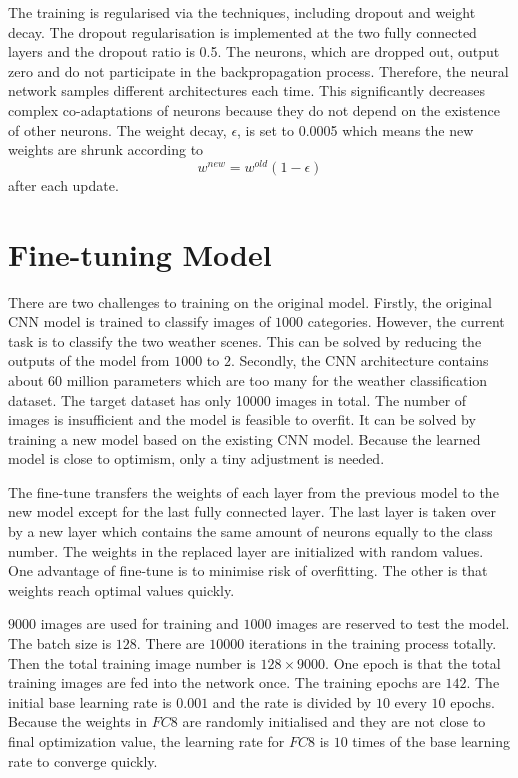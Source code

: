 The training is regularised via the techniques, including dropout and weight decay. The dropout regularisation is implemented at the two fully connected layers and the dropout ratio is 0.5. The neurons, which are dropped out, output zero and do not participate in the backpropagation process. Therefore, the neural network samples different architectures each time. This significantly decreases complex co-adaptations of neurons because they do not depend on the existence of other neurons. The weight decay, $\epsilon$, is set to 0.0005 which means the new weights are shrunk according to 
\begin{equation}\label{eq:WeightDecay}
w^{new} = w^{old}(1 - \epsilon)
\end{equation}
after each update.

\section{Fine-tuning Model}

There are two challenges to training on the original model. Firstly, the original CNN model is trained to classify images of $1000$ categories. However, the current task is to classify the two weather scenes. This can be solved by reducing the outputs of the model from $1000$ to $2$. Secondly, the CNN architecture contains about 60 million parameters which are too many for the weather classification dataset. The target dataset has only 10000 images in total. The number of images is insufficient and the model is feasible to overfit. It can be solved by training a new model based on the existing CNN model. Because the learned model is close to optimism, only a tiny adjustment is needed.

The fine-tune transfers the weights of each layer from the previous model to the new model except for the last fully connected layer. The last layer is taken over by a new layer which contains the same amount of neurons equally to the class number. The weights in the replaced layer are initialized with random values. One advantage of fine-tune is to minimise risk of overfitting. The other is that weights reach optimal values quickly.

$9000$ images are used for training and $1000$ images are reserved to test the model. The batch size is $128$. There are $10000$ iterations in the training process totally. Then the total training image number is $128\times9000$. One epoch is that the total training images are fed into the network once. The training epochs are $142$. The initial base learning rate is $0.001$ and the rate is divided by $10$ every $10$ epochs. Because the weights in $FC8$ are randomly initialised and they are not close to final optimization value, the learning rate for $FC8$ is $10$ times of the base learning rate to converge quickly.

